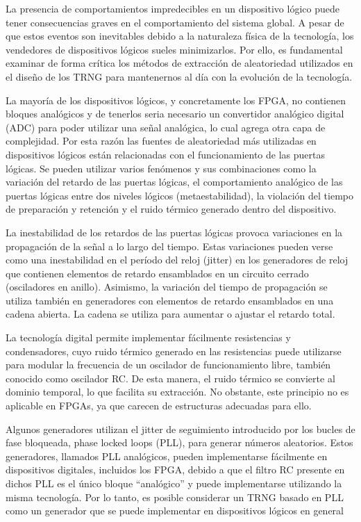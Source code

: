             La presencia de comportamientos impredecibles en un dispositivo lógico puede tener consecuencias graves en el comportamiento del sistema global. A pesar de que estos eventos son inevitables debido a la naturaleza física de la tecnología, los vendedores de dispositivos lógicos sueles minimizarlos. Por ello, es fundamental examinar de forma crítica los métodos de extracción de aleatoriedad utilizados en el diseño de los TRNG para mantenernos al día con la evolución de la tecnología.

            La mayoría de los dispositivos lógicos, y concretamente los FPGA, no contienen bloques analógicos y de tenerlos seria necesario un convertidor analógico digital (ADC) para poder utilizar una señal analógica, lo cual agrega otra capa de complejidad. Por esta razón las fuentes de aleatoriedad más utilizadas en dispositivos lógicos están relacionadas con el funcionamiento de las puertas lógicas. Se pueden utilizar varios fenómenos y sus combinaciones como la variación del retardo de las puertas lógicas, el comportamiento analógico de las puertas lógicas entre dos niveles lógicos (metaestabilidad), la violación del tiempo de preparación y retención y el ruido térmico generado dentro del dispositivo.	
					
	        La inestabilidad de los retardos de las puertas lógicas provoca variaciones en la propagación de la señal a lo largo del tiempo. Estas variaciones pueden verse como una inestabilidad  en el período del reloj (jitter) en los generadores de reloj que contienen elementos de retardo ensamblados en un circuito cerrado (osciladores en anillo). Asimismo, la variación del tiempo de propagación se utiliza también en generadores con elementos de retardo ensamblados en una cadena abierta. La cadena se utiliza para aumentar o ajustar el retardo total.

            La tecnología digital permite implementar fácilmente resistencias y condensadores, cuyo ruido térmico generado en las resistencias puede utilizarse para modular la frecuencia de un oscilador de funcionamiento libre, también conocido como oscilador RC. De esta manera, el ruido térmico se convierte al dominio temporal, lo que facilita su extracción. No obstante, este principio no es aplicable en FPGAs, ya que carecen de estructuras adecuadas para ello.

            Algunos generadores utilizan el jitter de seguimiento introducido por los bucles de fase bloqueada, phase locked loops (PLL), para generar números aleatorios. Estos generadores, llamados PLL analógicos, pueden implementarse fácilmente en dispositivos digitales, incluidos los FPGA, debido a que el filtro RC presente en dichos PLL es el único bloque ``analógico'' y puede implementarse utilizando la misma tecnología. Por lo tanto, es posible considerar un TRNG basado en PLL como un generador que se puede implementar en dispositivos lógicos en general
					

